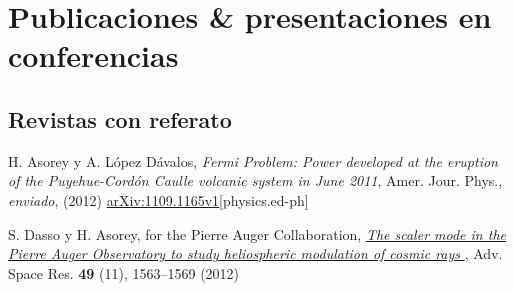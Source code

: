 \documentclass[11pt, a4paper]{article}
\newcommand{\years}[1]{\marginnote{\scriptsize #1}}
\begin{document}
% 
% 
% 

\section*{Publicaciones \& presentaciones en conferencias}

\subsection*{Revistas con referato}
\noindent

\years{2012}H. Asorey y A. López Dávalos, {\emph{Fermi Problem: Power developed
at the eruption of the Puyehue-Cordón Caulle volcanic system in June 2011}},
Amer. Jour. Phys., {\emph{enviado}}, (2012)
\href{http://arxiv.org/abs/1109.1165}{arXiv:1109.1165v1}[physics.ed-ph]

\years{2012}S. Dasso y H. Asorey, for the Pierre Auger Collaboration,
\href{http://dx.doi.org/10.1016/j.asr.2011.12.028}{\emph{ The scaler mode in
the Pierre Auger Observatory to study heliospheric modulation of cosmic rays
}}, Adv. Space Res. {\bf{49}} (11), 1563--1569 (2012)
\end{document}
